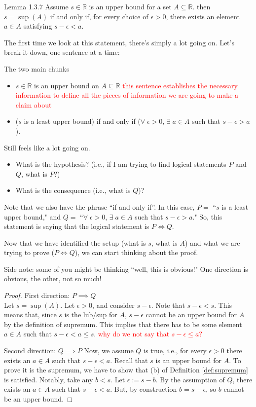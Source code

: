 \documentclass{ximera}
\begin{document}
\begin{lemma}{Lemma 1.3.7}
    Assume $s \in \mathbb{R}$ is an upper bound for a set $A \subseteq \mathbb{R}$.  then $s = \sup(A)$ if and only if, for every choice of $\epsilon > 0$, there exists an element $a \in A$ satisfying $s - \epsilon < a$.
\end{lemma}
The first time we look at this statement, there's simply a lot going on.  Let's break it down, one sentence at a time:

The two main chunks
 \begin{itemize}
     \item $s \in \mathbb{R}$ is an upper bound on $A \subseteq \mathbb{R}$ \textcolor{red}{this sentence establishes the necessary information to define all the pieces of information we are going to make a claim about}
     \item ($s$ is a least upper bound) if and only if ($\forall \; \epsilon > 0$, $\exists\; a \in A$ such that $s - \epsilon > a$).
 \end{itemize}
Still feels like a lot going on.
\begin{itemize}
    \item What is the hypothesis?  (i.e., if I am trying to find logical statements $P$ and $Q$, what is $P$?)
    \item What is the consequence (i.e., what is $Q$)?
\end{itemize}
Note that we also have the phrase ``if and only if''.  In this case, $P= $ ``$s$ is a least upper bound," and $Q =$ ``$\forall \; \epsilon > 0$, $\exists\; a \in A$ such that $s - \epsilon > a$."  So, this statement is saying that the logical statement is $P \iff Q$.

Now that we have identified the setup (what is $s$, what is $A$) and what we are trying to prove ($P\iff Q$), we can start thinking about the proof.

Side note: some of you might be thinking ``well, this is obvious!"  One direction is obvious, the other, not so much!

\begin{proof}
    First direction: $P \implies Q$
    \\
    Let $s = \sup(A)$.  Let $\epsilon > 0$, and consider $s - \epsilon$.  Note that $s - \epsilon <s$.  This means that, since $s$ is the lub/sup for $A$, $s -\epsilon$ cannot be an upper bound for $A$ by the definition of supremum.  This implies that there has to be some element $a \in A$ such that $s-\epsilon < a \leq s$.  \textcolor{red}{why do we not say that $s-\epsilon \leq a$?}

    Second direction: $Q \implies P$
    Now, we assume $Q$ is true, i.e., for every $\epsilon > 0$ there exists an $a \in A$ such that $s-\epsilon < a$.  Recall that $s$ is an upper bound for $A$.  To prove it is the supremum, we have to show that (b) of Definition \ref{def:supremum} is satisfied.  Notably, take any $b< s$.  Let $\epsilon := s - b$.  By the assumption of $Q$, there exists an $a \in A$ such that $s - \epsilon < a$.  But, by construction $b = s-\epsilon$, so $b$ cannot be an upper bound.
\end{proof}
\end{document}

